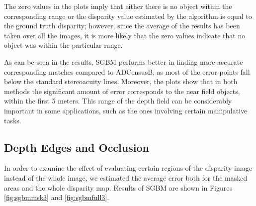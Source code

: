 The zero values in the plots imply that either there is no object within the corresponding range or the disparity value estimated by the algorithm
is equal to the ground truth disparity; however, since the average of the results has been taken over all the images, it is more likely that 
the zero values indicate that no object was within the particular range.

As can be seen in the results, SGBM performs better in finding more accurate corresponding matches 
compared to ADCensusB, as most of the error points fall below the standard stereoacuity lines. Moreover, the plots show that in both methods 
the significant amount of error
corresponds to the near field objects, within the first 5 meters. This range of the depth field can be considerably important in some applications,
such as the ones involving certain manipulative tasks.

\subsection{Depth Edges and Occlusion}
In order to examine the effect of evaluating certain regions of the disparity image instead of the whole image, 
we estimated the average error both for the masked areas and the whole disparity map. 
Results of SGBM are shown in Figures \ref{fig:sgbmmsk3} and \ref{fig:sgbmfull3}.

